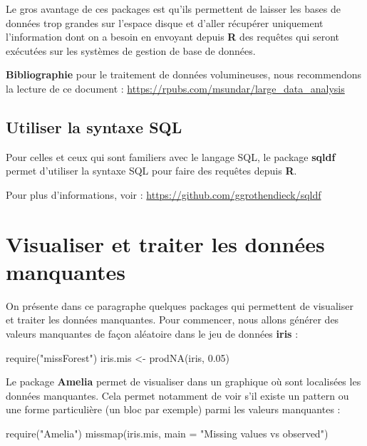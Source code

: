 \documentclass[
]{book}
\newenvironment{Shaded}{\begin{snugshade}}{\end{snugshade}}
\newcommand{\AttributeTok}[1]{\textcolor[rgb]{0.77,0.63,0.00}{#1}}
\newcommand{\FloatTok}[1]{\textcolor[rgb]{0.00,0.00,0.81}{#1}}
\newcommand{\FunctionTok}[1]{\textcolor[rgb]{0.00,0.00,0.00}{#1}}
\newcommand{\NormalTok}[1]{#1}
\newcommand{\OtherTok}[1]{\textcolor[rgb]{0.56,0.35,0.01}{#1}}
\newcommand{\StringTok}[1]{\textcolor[rgb]{0.31,0.60,0.02}{#1}}
\theoremstyle{definition}
\theoremstyle{definition}
\theoremstyle{definition}
\theoremstyle{definition}
\theoremstyle{remark}
\begin{document}
Le gros avantage de ces packages est qu'ils permettent de laisser les bases de données trop grandes sur l'espace disque et d'aller récupérer uniquement l'information dont on a besoin en envoyant depuis \textbf{R} des requêtes qui seront exécutées sur les systèmes de gestion de base de données.

\textbf{Bibliographie} pour le traitement de données volumineuses, nous recommendons la lecture de ce document : \url{https://rpubs.com/msundar/large_data_analysis}

\hypertarget{utiliser-la-syntaxe-sql}{%
\subsection{Utiliser la syntaxe SQL}\label{utiliser-la-syntaxe-sql}}

Pour celles et ceux qui sont familiers avec le langage SQL, le package \textbf{sqldf} permet d'utiliser la syntaxe SQL pour faire des requêtes depuis \textbf{R}.

Pour plus d'informations, voir : \url{https://github.com/ggrothendieck/sqldf}

\hypertarget{visualiser-et-traiter-les-donnuxe9es-manquantes}{%
\section{Visualiser et traiter les données manquantes}\label{visualiser-et-traiter-les-donnuxe9es-manquantes}}

On présente dans ce paragraphe quelques packages qui permettent de visualiser et traiter les données manquantes. Pour commencer, nous allons générer des valeurs manquantes de façon aléatoire dans le jeu de données \textbf{iris} :

\begin{Shaded}
\begin{Highlighting}[]
\FunctionTok{require}\NormalTok{(}\StringTok{"missForest"}\NormalTok{)}
\NormalTok{iris.mis }\OtherTok{\textless{}{-}} \FunctionTok{prodNA}\NormalTok{(iris, }\FloatTok{0.05}\NormalTok{)}
\end{Highlighting}
\end{Shaded}

Le package \textbf{Amelia} permet de visualiser dans un graphique où sont localisées les données manquantes. Cela permet notamment de voir s'il existe un pattern ou une forme particulière (un bloc par exemple) parmi les valeurs manquantes :

\begin{Shaded}
\begin{Highlighting}[]
\FunctionTok{require}\NormalTok{(}\StringTok{"Amelia"}\NormalTok{)}
\FunctionTok{missmap}\NormalTok{(iris.mis, }\AttributeTok{main =} \StringTok{"Missing values vs observed"}\NormalTok{)}
\end{Highlighting}
\end{Shaded}
\end{document}
